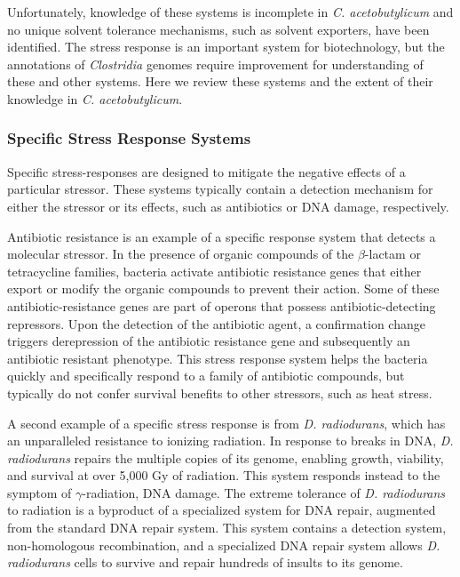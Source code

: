 Unfortunately, knowledge of these systems is incomplete in \textit{C. acetobutylicum} and no unique solvent tolerance mechanisms, such as solvent exporters, have been identified. The stress response is an important system for biotechnology, but the annotations of \textit{Clostridia} genomes require improvement for understanding of these and other systems. Here we review these systems and the extent of their knowledge in \textit{C. acetobutylicum}.


\subsubsection{Specific Stress Response Systems}
Specific stress-responses are designed to mitigate the negative effects of a particular stressor. These systems typically contain a detection mechanism for either the stressor or its effects, such as antibiotics\cite{127} or DNA damage,\cite{128} respectively.

Antibiotic resistance is an example of a specific response system that detects a molecular stressor. In the presence of organic compounds of the $\beta$-lactam\cite{127} or tetracycline families,\cite{130} bacteria activate antibiotic resistance genes that either export or modify the organic compounds to prevent their action. Some of these antibiotic-resistance genes are part of operons that possess antibiotic-detecting repressors.\cite{127} Upon the detection of the antibiotic agent, a confirmation change triggers derepression of the antibiotic resistance gene and subsequently an antibiotic resistant phenotype. This stress response system helps the bacteria quickly and specifically respond to a family of antibiotic compounds, but typically do not confer survival benefits to other stressors, such as heat stress.

A second example of a specific stress response is from \textit{D. radiodurans}, which has an unparalleled resistance to ionizing radiation.\cite{129} In response to breaks in DNA, \textit{D. radiodurans} repairs the multiple copies of its genome, enabling growth, viability, and survival at over 5,000 Gy of radiation.\cite{129} This system responds instead to the symptom of $\gamma$-radiation, DNA damage. The extreme tolerance of \textit{D. radiodurans} to radiation is a byproduct of a specialized system for DNA repair,\cite{129} augmented from the standard DNA repair system.\cite{128} This system contains a detection system, non-homologous recombination, and a specialized DNA repair system allows \textit{D. radiodurans} cells to survive and repair hundreds of insults to its genome. 

